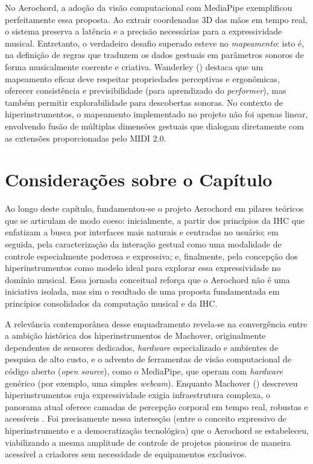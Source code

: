 No Aerochord, a adoção da visão computacional com MediaPipe exemplificou perfeitamente essa proposta. Ao extrair coordenadas 3D das mãos em tempo real, o sistema preserva a latência e a precisão necessárias para a expressividade musical. Entretanto, o verdadeiro desafio superado esteve no \emph{mapeamento}: isto é, na definição de regras que traduzem os dados gestuais em parâmetros sonoros de forma musicalmente coerente e criativa. Wanderley (\citeyear{wanderley2001gestural}) destaca que um mapeamento eficaz deve respeitar propriedades perceptivas e ergonômicas, oferecer consistência e previsibilidade (para aprendizado do \textit{performer}), mas também permitir explorabilidade para descobertas sonoras. No contexto de hiperinstrumentos, o mapeamento implementado no projeto não foi apenas linear, envolvendo fusão de múltiplas dimensões gestuais que dialogam diretamente com as extensões proporcionadas pelo MIDI 2.0.

\section{Considerações sobre o Capítulo}
\label{sec:consideracoes_sobre_o_capitulo}

Ao longo deste capítulo, fundamentou-se o projeto Aerochord em pilares teóricos que se articulam de modo coeso: inicialmente, a partir dos princípios da IHC que enfatizam a busca por interfaces mais naturais e centradas no usuário; em seguida, pela caracterização da interação gestual como uma modalidade de controle especialmente poderosa e expressiva; e, finalmente, pela concepção dos hiperinstrumentos como modelo ideal para explorar essa expressividade no domínio musical. Essa jornada conceitual reforça que o Aerochord não é uma iniciativa isolada, mas sim o resultado de uma proposta fundamentada em princípios consolidados da computação musical e da IHC.

A relevância contemporânea desse enquadramento revela-se na convergência entre a ambição histórica dos hiperinstrumentos de Machover, originalmente dependentes de sensores dedicados, \textit{hardware} especializado e ambientes de pesquisa de alto custo, e o advento de ferramentas de visão computacional de código aberto (\textit{open source}), como o MediaPipe, que operam com \textit{hardware} genérico (por exemplo, uma simples \textit{webcam}). Enquanto Machover (\citeyear{Machover1992}) descreveu hiperinstrumentos cuja expressividade exigia infraestrutura complexa, o panorama atual oferece camadas de percepção corporal em tempo real, robustas e acessíveis \cite{lugaresi2019mediapipe}. Foi precisamente nessa interseção (entre o conceito expressivo de hiperinstrumento e a democratização tecnológica) que o Aerochord se estabeleceu, viabilizando a mesma amplitude de controle de projetos pioneiros de maneira acessível a criadores sem necessidade de equipamentos exclusivos.

